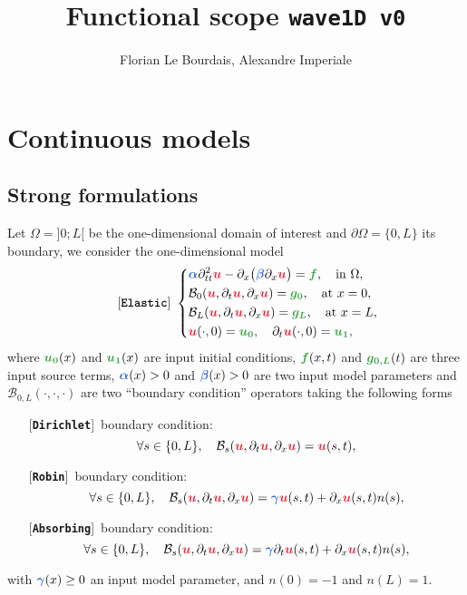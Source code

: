 \documentclass[11pt,a4paper]{article}
\title{Functional scope \texttt{wave1D v0}}
\author[1]{Florian Le Bourdais, Alexandre Imperiale}
\newcommand{\unknown}[1]{\bm{{\color{myred}{#1}}}}
\newcommand{\param}[1]{\bm{{\color{myhyperblue}{#1}}}}
\newcommand{\data}[1]{\bm{{\color{mygreen}{#1}}}}
\newcommand{\keyword}[1]{[\texttt{\textbf{#1}}]\!\,}
\begin{document}
% 

\maketitle

\section{Continuous models}
\subsection{Strong formulations}
Let $\Omega = ]0; L[$ be the one-dimensional domain of interest and $\partial\Omega = \{0, L\}$ its boundary, we consider the one-dimensional model
\begin{equation*}
\quad \quad
\keyword{Elastic}~
\left\lbrace
\begin{aligned}
& \param{\alpha}\partial^2_{tt} \unknown{u} - \partial_x\big( \param{\beta} \partial_x \unknown{u} \big) = \data{f},\quad \text{in }\Omega,\\
& \mathcal{B}_0(\unknown{u}, \partial_t \unknown{u}, \partial_x \unknown{u}) = \data{g_0},\quad \text{at } x = 0,\\
&\mathcal{B}_L(\unknown{u}, \partial_t \unknown{u}, \partial_x \unknown{u}) = \data{g_L},\quad \text{at } x = L,\\
& \unknown{u}(\cdot, 0) = \data{u_0},\quad \partial_t\unknown{u}(\cdot, 0) = \data{u_1},
\end{aligned}
\right.
\end{equation*}
where $\data{u_0}(x)$ and $\data{u_1}(x)$ are input initial conditions, $\data{f}(x, t)$ and $\data{g_{0,L}}(t)$ are three input source terms, $\param{\alpha}(x) > 0$ and $\param{\beta}(x) > 0$ are two input model parameters and $\mathcal{B}_{0, L}(\cdot, \cdot, \cdot)$ are two ``boundary condition'' operators taking the following forms
\begin{itemize}
\item[] \keyword{Dirichlet} boundary condition: 
\begin{equation*}
\forall s \in\{0, L\},\quad \mathcal{B}_s(\unknown{u}, \partial_t \unknown{u}, \partial_x \unknown{u}) = \unknown{u}(s, t),
\end{equation*}
\item[] \keyword{Robin} boundary condition: 
\begin{equation*}
\forall s \in\{0, L\},\quad \mathcal{B}_s(\unknown{u}, \partial_t \unknown{u}, \partial_x \unknown{u}) = \param{\gamma}\unknown{u}(s, t) + \partial_x \unknown{u}(s, t) n(s),
\end{equation*}
\item[] \keyword{Absorbing} boundary condition:
\begin{equation*}
\forall s \in\{0, L\},\quad \mathcal{B}_s(\unknown{u}, \partial_t \unknown{u}, \partial_x \unknown{u}) = \param{\gamma} \partial_t \unknown{u}(s, t) + \partial_x \unknown{u}(s, t) n(s),
\end{equation*}
\end{itemize}
with $\param{\gamma}(x) \geq 0$ an input model parameter, and $n(0) = -1$ and $n(L) = 1$.
\end{document}
